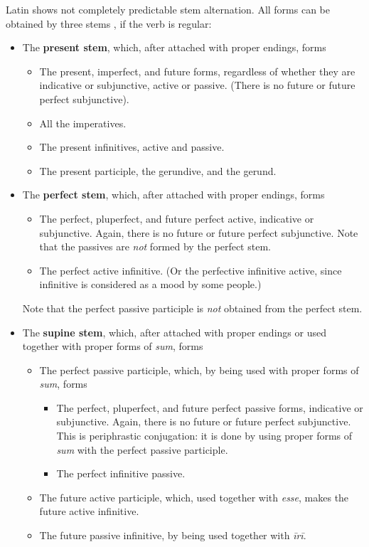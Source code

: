 \documentclass[a4paper, oneside]{report}
\newcommand*{\citesec}[1]{\S~{#1}}
\newcommand*{\concept}[1]{\textbf{#1}}
\newcommand{\corpus}[1]{\emph{#1}}
\begin{document}
Latin shows not completely predictable stem alternation.
All forms can be obtained by three stems \citep[\citesec{164}]{allen1903allen},
if the verb is regular:
\begin{itemize}
    \item The \concept{present stem}, which, after attached with proper endings, forms
    \begin{itemize}
        \item The \acl{present}, \acl{imperfect}, and future forms, 
        regardless of whether they are indicative or subjunctive,
        active or passive. (There is no future or future perfect subjunctive).
        \item All the imperatives.
        \item The present infinitives, active and passive.
        \item The present participle, the gerundive, and the gerund.
    \end{itemize}
    \item The \concept{perfect stem}, which, after attached with proper endings, forms 
    \begin{itemize}
        \item The perfect, pluperfect, and future perfect active, indicative or subjunctive.
        Again, there is no future or future perfect subjunctive.
        Note that the passives are \emph{not} formed by the perfect stem.
        \item The perfect active infinitive. 
        (Or the perfective infinitive active, since infinitive is considered as a mood by some people.)
    \end{itemize}
    Note that the perfect passive participle is \emph{not} obtained from the perfect stem.
    \item The \concept{supine stem}, 
    which, after attached with proper endings or used together with proper forms of \corpus{sum},
    forms 
    \begin{itemize}
        \item The perfect passive participle, which, by being used with proper forms of \corpus{sum}, forms
        \begin{itemize}
            \item The perfect, pluperfect, and future perfect passive forms, indicative or subjunctive.
            Again, there is no future or future perfect subjunctive.
            This is periphrastic conjugation: it is done by using proper forms of \corpus{sum}
            with the perfect passive participle.
            \item The perfect infinitive passive.
        \end{itemize}
        \item The future active participle, which, used together with \corpus{esse},
        makes the future active infinitive.
        \item The future passive infinitive, by being used together with \corpus{īrī}.
    \end{itemize}
\end{itemize}
\end{document}
